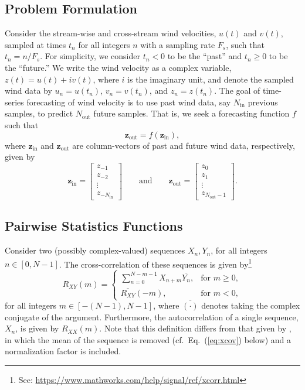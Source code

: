 \documentclass[11pt, oneside]{article}
\newcommand{\eqnref}[1]{Eq.~(\ref{#1})}
\begin{document}
\subsection{Problem Formulation}
Consider the stream-wise and cross-stream wind velocities, $u(t)$ and $v(t)$, sampled at times $t_n$ for all integers $n$ with a sampling rate $F_s$, such that $t_n = n/F_s$.
For simplicity, we consider $t_n < 0$ to be the ``past'' and $t_n \geq 0$ to be the ``future.''
We write the wind velocity as a complex variable, $z(t) = u(t) + i v(t)$, where $i$ is the imaginary unit, and denote the sampled wind data by $u_n = u(t_n)$, $v_n = v(t_n)$, and $z_n = z(t_n)$.
The goal of time-series forecasting of wind velocity is to use past wind data, say $N_\text{in}$ previous samples, to predict $N_\text{out}$ future samples.
That is, we seek a forecasting function $f$ such that
\begin{equation}
\mathbf{z}_\text{out} = f(\mathbf{z}_\text{in}),
\end{equation}
where $\mathbf{z}_\textrm{in}$ and $\mathbf{z}_\text{out}$ are column-vectors of past and future wind data, respectively, given by
\begin{equation}
\mathbf{z}_\text{in} = 
\begin{bmatrix}
z_{-1} \\ z_{-2} \\ \vdots \\ z_{-N_\text{in}}
\end{bmatrix}
\quad\quad \text{and} \quad\quad
\mathbf{z}_\text{out} = 
\begin{bmatrix}
z_0 \\ z_1 \\ \vdots \\ z_{N_\text{out} - 1}
\end{bmatrix}.
\end{equation}

\subsection{Pairwise Statistics Functions}
Consider two (possibly complex-valued) sequences $X_n,Y_n$, for all integers $n \in [0,N-1]$.
The cross-correlation of these sequences is given by\footnote{See: \url{https://www.mathworks.com/help/signal/ref/xcorr.html}}
\begin{equation}\label{eq:xcorr}
R_{XY}(m) =
\begin{cases}
\displaystyle \sum_{n=0}^{N-m-1} X_{n+m} \overline{Y_n}, & \text{for } m \geq 0,\\[20pt]
\overline{R_{XY}}(-m), & \text{for } m < 0,
\end{cases}
\end{equation}
for all integers $m \in [-(N-1),N-1]$, where $\overline{(\cdot)}$ denotes taking the complex conjugate of the argument.
Furthermore, the autocorrelation of a single sequence, $X_n$, is given by $R_{XX}(m)$.
Note that this definition differs from that given by \citet[Sec.~8.2.1]{Stull1988}, in which the mean of the sequence is removed (cf.~\eqnref{eq:xcov} below) and a normalization factor is included.
\end{document}
